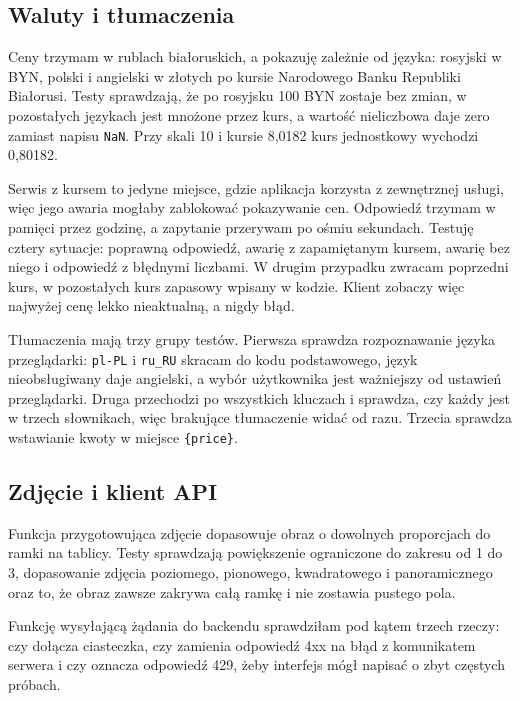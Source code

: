 \subsection{Waluty i tłumaczenia}
\label{ssec:waluty}

Ceny trzymam w rublach białoruskich, a pokazuję zależnie od języka: rosyjski w BYN, polski i angielski w złotych po kursie Narodowego Banku Republiki Białorusi. Testy sprawdzają, że po rosyjsku 100 BYN zostaje bez zmian, w pozostałych językach jest mnożone przez kurs, a wartość nieliczbowa daje zero zamiast napisu \texttt{NaN}. Przy skali 10 i kursie 8,0182 kurs jednostkowy wychodzi 0,80182.

Serwis z kursem to jedyne miejsce, gdzie aplikacja korzysta z zewnętrznej usługi, więc jego awaria mogłaby zablokować pokazywanie cen. Odpowiedź trzymam w pamięci przez godzinę, a zapytanie przerywam po ośmiu sekundach. Testuję cztery sytuacje: poprawną odpowiedź, awarię z zapamiętanym kursem, awarię bez niego i odpowiedź z błędnymi liczbami. W drugim przypadku zwracam poprzedni kurs, w pozostałych kurs zapasowy wpisany w kodzie. Klient zobaczy więc najwyżej cenę lekko nieaktualną, a nigdy błąd.

Tłumaczenia mają trzy grupy testów. Pierwsza sprawdza rozpoznawanie języka przeglądarki: \texttt{pl-PL} i \texttt{ru\_RU} skracam do kodu podstawowego, język nieobsługiwany daje angielski, a wybór użytkownika jest ważniejszy od ustawień przeglądarki. Druga przechodzi po wszystkich kluczach i sprawdza, czy każdy jest w trzech słownikach, więc brakujące tłumaczenie widać od razu. Trzecia sprawdza wstawianie kwoty w miejsce \texttt{\{price\}}.

\subsection{Zdjęcie i klient API}
\label{ssec:kadrowanie}

Funkcja przygotowująca zdjęcie dopasowuje obraz o dowolnych proporcjach do ramki na tablicy. Testy sprawdzają powiększenie ograniczone do zakresu od 1 do 3, dopasowanie zdjęcia poziomego, pionowego, kwadratowego i panoramicznego oraz to, że obraz zawsze zakrywa całą ramkę i nie zostawia pustego pola.

Funkcję wysyłającą żądania do backendu sprawdziłam pod kątem trzech rzeczy: czy dołącza ciasteczka, czy zamienia odpowiedź 4xx na błąd z komunikatem serwera i czy oznacza odpowiedź 429, żeby interfejs mógł napisać o zbyt częstych próbach.
